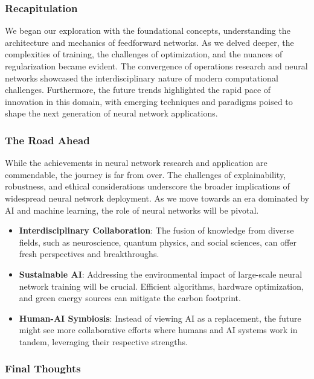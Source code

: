 \subsubsection{Recapitulation}

We began our exploration with the foundational concepts, understanding the architecture and mechanics of feedforward networks. As we delved deeper, the complexities of training, the challenges of optimization, and the nuances of regularization became evident. The convergence of operations research and neural networks showcased the interdisciplinary nature of modern computational challenges. Furthermore, the future trends highlighted the rapid pace of innovation in this domain, with emerging techniques and paradigms poised to shape the next generation of neural network applications.

\subsubsection{The Road Ahead}

While the achievements in neural network research and application are commendable, the journey is far from over. The challenges of explainability, robustness, and ethical considerations underscore the broader implications of widespread neural network deployment. As we move towards an era dominated by AI and machine learning, the role of neural networks will be pivotal.

\begin{itemize}
    \item \textbf{Interdisciplinary Collaboration}: The fusion of knowledge from diverse fields, such as neuroscience, quantum physics, and social sciences, can offer fresh perspectives and breakthroughs.
    \item \textbf{Sustainable AI}: Addressing the environmental impact of large-scale neural network training will be crucial. Efficient algorithms, hardware optimization, and green energy sources can mitigate the carbon footprint.
    \item \textbf{Human-AI Symbiosis}: Instead of viewing AI as a replacement, the future might see more collaborative efforts where humans and AI systems work in tandem, leveraging their respective strengths.
\end{itemize}

\subsubsection{Final Thoughts}

